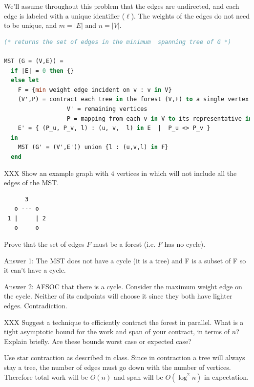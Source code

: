We'll assume throughout this problem that the edges are undirected,
and each edge is labeled with a unique identifier ($\ell$). The
weights of the edges do not need to be unique, and $m = |E|$ and $n =
|V|$.

\begin{lstlisting}[language=ocaml, numbers=none]
(* returns the set of edges in the minimum  spanning tree of G *)

MST (G = (V,E)) = 
  if |E| = 0 then {}
  else let
    F = {min weight edge incident on v : v in V}
    (V',P) = contract each tree in the forest (V,F) to a single vertex
                  V' = remaining vertices
                  P = mapping from each v in V to its representative in V'
    E' = { (P_u, P_v, l) : (u, v,  l) in E  |  P_u <> P_v }
  in 
    MST (G' = (V',E')) union {l : (u,v,l) in F}
  end
\end{lstlisting}

\begin{problem}
XXX
\ask[4.]
Show an example graph with $4$ vertices in which  will not include all
the edges of the MST.

\sol
\begin{verbatim}
      3
   o --- o
 1 |     | 2
   o     o
\end{verbatim}

\ask[4]
Prove that the set of edges $F$ must be a forest (i.e. $F$ has no cycle).

\sol
Answer 1: The MST does not have a cycle (it is a tree) and F is a subset of F
so it can't have a cycle.

Answer 2: AFSOC that there is a cycle.  Consider the maximum weight
edge on the cycle.  Neither of its endpoints will choose it since they
both have lighter edges.  Contradiction.
\end{problem}

\newpage

\begin{problem}[4.]
XXX
\ask
Suggest a technique to efficiently contract the forest in parallel.
What is a tight asymptotic bound for the work and span of your contract,
in terms of $n$? Explain briefly. Are these bounds worst case or
expected case?

\sol
Use star contraction as described in class. Since in contraction a tree
will always stay a tree, the number of edges must go down with the number
of vertices. Therefore total work will be $O(n)$ and span will be
$O(\log^2 n)$ in expectation.
\end{problem}

